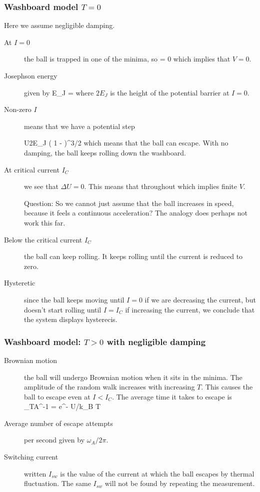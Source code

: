 \subsubsection{Washboard model $T= 0$}
Here we assume negligible damping. 

\begin{description}
\item[At $I = 0$] the ball is trapped in one of the minima, so
\beq
{} = 0 
\eeq
which implies that $V = 0$. 

\item[Josephson energy] given by
\beq
E_J = 
\eeq
where $2 E_J$ is the height of the potential barrier at $I = 0$. 

\item[Non-zero $I$] means that we have a  potential step

\beq
\Delta U\simeq 2E_J \left( 1 -  \right)^{3/2}
\eeq
which means that the ball can escape. With no damping, the ball keeps rolling down the washboard. 

\item[At critical current $I_C$] we see that $\Delta U = 0$. This means that 
\beq
{} 
\eeq
 throughout which implies finite $V$. 
 
 Question: So we cannot just assume that the ball increases in speed, because it feels a continuous acceleration? The analogy does perhaps not work this far. 
 
 \item[Below the critical current $I_C$] the ball can keep rolling. It keeps rolling until the current is reduced to zero. 
 
 \item[Hysteretic] since the ball keeps moving until $I = 0$ if we are decreasing the current, but doesn't start rolling until $I = I_C$ if increasing the current, we conclude that the system displays hysterecis. 
 
 \end{description}
 
\subsubsection{Washboard model: $T>0$ with negligible damping}
\begin{description}

\item[Brownian motion] the ball will undergo Brownian motion when it sits in the minima. The amplitude of the random walk increases with increasing $T$. This causes the ball to escape even at $I < I_C$.  The average time it takes to escape is
\beq
\tau_{TA}^{-1} =  e^{- \Delta U/k_B T}  
\eeq

\item[Average number of escape attempts] per second given by $\omega_A /2\pi$. 

\item[Switching current] written $I_{sw}$ is the value of the current at which the ball escapes by thermal fluctuation. The same $I_{sw}$ will not be found by repeating the measurement. 

\end{description}

